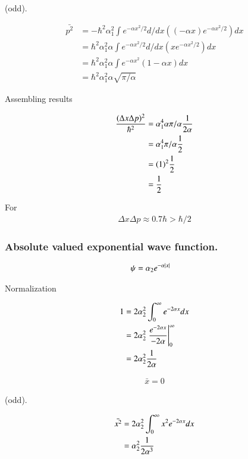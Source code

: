 \documentclass{article}
\begin{document}
(odd).

\begin{align*}
\bar{p^2} 
&= - \hbar^2 \alpha_1^2 \int e^{-\alpha x^2 /2} d/dx ((-\alpha x) e^{-\alpha x^2 /2}) dx \\
&= \hbar^2 \alpha_1^2 \alpha \int e^{-\alpha x^2 /2} d/dx (x e^{-\alpha x^2 /2}) dx \\
&= \hbar^2 \alpha_1^2 \alpha \int e^{-\alpha x^2 } ( 1 - \alpha x) dx \\
&= \hbar^2 \alpha_1^2 \alpha \sqrt{\pi/\alpha}
\end{align*}

Assembling results

\begin{align*}
\frac{(\Delta x \Delta p)^2}{\hbar^2} 
&= \alpha_1^4 \alpha {\pi/\alpha} \frac{1}{2\alpha} \\
&= \alpha_1^4 {\pi/\alpha} \frac{1}{2} \\
&= (1)^2 \frac{1}{2} \\
&= \frac{1}{2} \\
\end{align*}

For
\begin{align*}
\Delta x \Delta p \approx 0.7 \hbar > \hbar/2
\end{align*}

\subsubsection{ Absolute valued exponential wave function. }

\begin{align*}
\psi &= \alpha_2 e^{-\alpha\left\lvert{x}\right\rvert}
\end{align*}

Normalization

\begin{align*}
1 
&= 2 \alpha_2^2 \int_0^\infty e^{-2 \alpha{x}} dx \\
&= 2 \alpha_2^2 \left. \frac{e^{-2 \alpha{x}}}{-2\alpha} \right\vert_0^\infty \\
&= 2 \alpha_2^2 \frac{1}{2\alpha}
\end{align*}

\begin{align*}
\bar{x} = 0
\end{align*}

(odd).

\begin{align*}
\bar{x^2} 
&= 2 \alpha_2^2 \int_0^\infty x^2 e^{-2\alpha x} dx \\
&= \alpha_2^2 \frac{1}{2 \alpha^3}
\end{align*}
\end{document}
